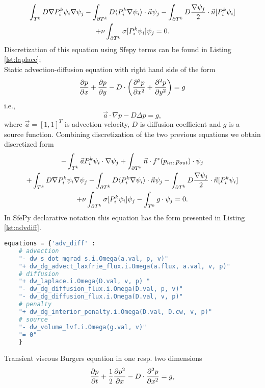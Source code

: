 \begin{multline}
	\int_{T^k} D\nabla P^k_i\psi_i \nabla \psi_j
	- \int_{\partial T^k} D \langle P^k_i\nabla\psi_i\rangle \cdot \vec{n}\psi_j 
    - \int_{\partial T^k} D \frac{\nabla \psi_j}{2}\cdot \vec{n} [P^k_i\psi_i] \\ 
    + \nu \int_{\partial T^k} \sigma [P^k_i\psi_i]\psi_j 
    = 0.
\end{multline}
Discretization of this equation using Sfepy terms can be found in Listing 
\ref{lst:laplace};\\
Static advection-diffusion equation with right hand side of the form
\begin{equation}
\label{eq:ex_advdiff}
\frac{\partial p}{\partial x} + \frac{\partial p}{\partial y} - D \cdot \left( \frac{\partial^2 p}{\partial x^2} + \frac{\partial^2 
p}{\partial y^2} \right) = g
\end{equation}
i.e.,
\begin{equation}
\vec{a} \cdot \nabla p - D \Delta p = g,
\end{equation}
where $\vec{a} = [1, 1]^T$ is advection velocity, $D$ is diffusion coefficient and $g$ is 
a source function. Combining discretization of the two previous equations we 
obtain 
discretized form
\begin{multline}
- \int_{T^k} \vec{a}P_i^k\psi_i\cdot\nabla\psi_j 
+ \int_{\partial{T^k}} \vec{n}\cdot f^{*} (p_{in}, p_{out})\cdot\psi_j\\
+ \int_{T^k} D\nabla P^k_i\psi_i \nabla \psi_j
- \int_{\partial T^k} D \langle P^k_i\nabla\psi_i\rangle \cdot \vec{n}\psi_j
- \int_{\partial T^k} D \frac{\nabla \psi_j}{2}\cdot \vec{n} [P^k_i\psi_i] \\
+ \nu \int_{\partial T^k} \sigma [P^k_i\psi_i]\psi_j
- \int_{T^k} g\cdot \psi_j
= 0.
\end{multline}
In SfePy declarative notation this equation has the form presented in 
Listing \ref{lst:advdiff}.
\setcounter{lstannotation}{0}
\begin{lstlisting}[language=Python, caption=Static advection-diffusion equation
\label{lst:advdiff}]
equations = {'adv_diff' :
	# advection
	"- dw_s_dot_mgrad_s.i.Omega(a.val, p, v)"
	"+ dw_dg_advect_laxfrie_flux.i.Omega(a.flux, a.val, v, p)"
	# diffusion
	"+ dw_laplace.i.Omega(D.val, v, p) "
	"- dw_dg_diffusion_flux.i.Omega(D.val, p, v)"
	"- dw_dg_diffusion_flux.i.Omega(D.val, v, p)"
	# penalty
	"+ dw_dg_interior_penalty.i.Omega(D.val, D.cw, v, p)"
	# source
	"- dw_volume_lvf.i.Omega(g.val, v)"
	"= 0"
	}
\end{lstlisting}
Transient viscous Burgers equation in one resp. two dimensions
\begin{equation}
\frac{\partial p}{\partial t} + \frac{1}{2}\frac{\partial p^2}{\partial x} - D \cdot\frac{\partial^2 p}{\partial x^2} = g,
\end{equation}
